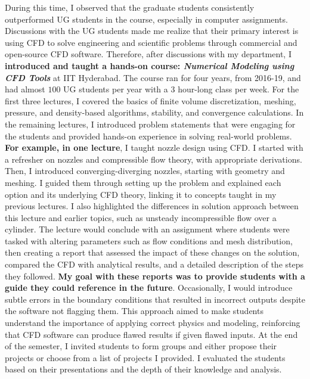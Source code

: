\documentclass[11pt,a4paper,times]{moderncv} %
\begin{document}
During this time, I observed that the graduate students consistently outperformed UG students in the course, especially in computer assignments. Discussions with the UG students made me realize that their primary interest is using CFD to solve engineering and scientific problems through commercial and open-source CFD software. Therefore, after discussions with my department, I \textbf{introduced and taught a hands-on course: \textit{Numerical Modeling using CFD Tools}} at IIT Hyderabad. The course ran for four years, from 2016-19, and had almost $100$ UG students per year with a $3$ hour-long class per week. For the first three lectures, I covered the basics of finite volume discretization, meshing, pressure, and density-based algorithms, stability, and convergence calculations. In the remaining lectures, I introduced problem statements that were engaging for the students and provided hands-on experience in solving real-world problems.\\
\textbf{For example, in one lecture}, I taught nozzle design using CFD. I started with a refresher on nozzles and compressible flow theory, with appropriate derivations. Then, I introduced converging-diverging nozzles, starting with geometry and meshing. I guided them through setting up the problem and explained each option and its underlying CFD theory, linking it to concepts taught in my previous lectures. I also highlighted the differences in solution approach between this lecture and earlier topics, such as unsteady incompressible flow over a cylinder. The lecture would conclude with an assignment where students were tasked with altering parameters such as flow conditions and mesh distribution, then creating a report that assessed the impact of these changes on the solution, compared the CFD with analytical results, and a detailed description of the steps they followed. \textbf{My goal with these reports was to provide students with a guide they could reference in the future}. Occasionally, I would introduce subtle errors in the boundary conditions that resulted in incorrect outputs despite the software not flagging them. This approach aimed to make students understand the importance of applying correct physics and modeling, reinforcing that CFD software can produce flawed results if given flawed inputs. At the end of the semester, I invited students to form groups and either propose their projects or choose from a list of projects I provided. I evaluated the students based on their presentations and the depth of their knowledge and analysis.\\
\end{document}
